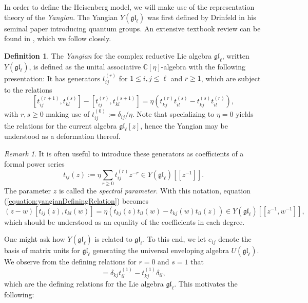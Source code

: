 \documentclass[11pt]{report}
\theoremstyle{definition}
\newtheorem{definition}[theorem]{Definition}
\theoremstyle{remark}
\newtheorem*{remark}{Remark}
\theoremstyle{remark}
\newcommand{\C}{\mathbb{C}}
\begin{document}
In order to define the Heisenberg model, we will make use of the representation theory of the \emph{Yangian}. The Yangian $Y(\mathfrak{gl}_\ell)$ was first defined by Drinfeld in his seminal paper \cite{article:drinfeld:1985} introducing quantum groups. An extensive textbook review can be found in \cite{book:molev}, which we follow closely.

\begin{definition}
The \emph{Yangian} for the complex reductive Lie algebra $\mathfrak{gl}_\ell$, written $Y(\mathfrak{gl}_\ell)$, is defined as the unital associative $\C[\eta]$-algebra with the following presentation: It has generators $t_{ij}^{(r)}$ for $1 \leq i,j \leq \ell$ and $r \geq 1$, which are subject to the relations
\begin{equation}\label{equation:yangianDefiningRelation}
[t_{ij}^{(r+1)},t_{kl}^{(s)}] - [t_{ij}^{(r)},t_{kl}^{(s+1)}] = \eta(t_{kj}^{(r)} t_{il}^{(s)} - t_{kj}^{(s)} t_{il}^{(r)}),
\end{equation}
with $r,s \geq 0$ making use of $t_{ij}^{(0)} := \delta_{ij}/\eta$. Note that specializing to $\eta = 0$ yields the relations for the current algebra $\mathfrak{gl}_\ell[z]$, hence the Yangian may be understood as a deformation thereof.
\end{definition}

\begin{remark}
It is often useful to introduce these generators as coefficients of a formal power series
\begin{equation*}
t_{ij}(z) := \eta \sum_{r \geq 0} t_{ij}^{(r)} z^{-r} \in Y(\mathfrak{gl}_\ell)[[z^{-1}]].
\end{equation*}
The parameter $z$ is called the \emph{spectral parameter}. With this notation, equation (\ref{equation:yangianDefiningRelation}) becomes
\begin{equation}\label{equation:yangianDefiningRelationUV}
(z-w) [t_{ij}(z),t_{kl}(w)] = \eta(t_{kj}(z) t_{il}(w) - t_{kj}(w) t_{il}(z)) \in Y(\mathfrak{gl}_\ell)[[z^{-1},w^{-1}]],
\end{equation}
which should be understood as an equality of the coefficients in each degree.
\end{remark}

One might ask how $Y(\mathfrak{gl}_\ell)$ is related to $\mathfrak{gl}_\ell$. To this end, we let $e_{ij}$ denote the basis of matrix units for $\mathfrak{gl}_\ell$ generating the universal enveloping algebra $U(\mathfrak{gl}_\ell)$. We observe from the defining relations for $r=0$ and $s=1$ that
\begin{equation*}
[t_{ij}^{(1)},t_{kl}^{(1)}] = \delta_{kj} t_{il}^{(1)} - t_{kj}^{(1)} \delta_{il},
\end{equation*}
which are the defining relations for the Lie algebra $\mathfrak{gl}_\ell$. This motivates the following:
\end{document}
